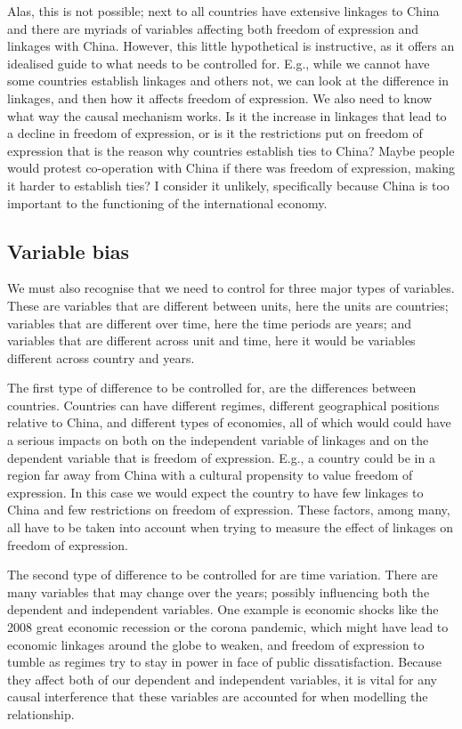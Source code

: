 Alas, this is not possible; next to all countries have extensive linkages to China and there are myriads of variables affecting both freedom of expression and linkages with China. However, this little hypothetical is instructive, as it offers an idealised guide to what needs to be controlled for. E.g., while we cannot have some countries establish linkages and others not, we can look at the difference in linkages, and then how it affects freedom of expression. We also need to know what way the causal mechanism works. Is it the increase in linkages that lead to a decline in freedom of expression, or is it the restrictions put on freedom of expression that is the reason why countries establish ties to China? Maybe people would protest co-operation with China if there was freedom of expression, making it harder to establish ties? I consider it unlikely, specifically because China is too important to the functioning of the international economy. 

\subsection{Variable bias}
We must also recognise that we need to control for three major types of variables. These are variables that are different between units, here the units are countries; variables that are different over time, here the time periods are years; and variables that are different across unit and time, here it would be variables different across country and years. 

The first type of difference to be controlled for, are the differences between countries. Countries can have different regimes, different geographical positions relative to China, and different types of economies, all of which would could have a serious impacts on both on the independent variable of linkages and on the dependent variable that is freedom of expression. E.g., a country could be in a region far away from China with a cultural propensity to value freedom of expression. In this case we would expect the country to have few linkages to China and few restrictions on freedom of expression. These factors, among many, all have to be taken into account when trying to measure the effect of linkages on freedom of expression. 

The second type of difference to be controlled for are time variation. There are many variables that may change over the years; possibly influencing both the dependent and independent variables. One example is economic shocks like the 2008 great economic recession or the corona pandemic, which might have lead to economic linkages around the globe to weaken, and freedom of expression to tumble as regimes try to stay in power in face of public dissatisfaction. Because they affect both of our dependent and independent variables, it is vital for any causal interference that these variables are accounted for when modelling the relationship.

